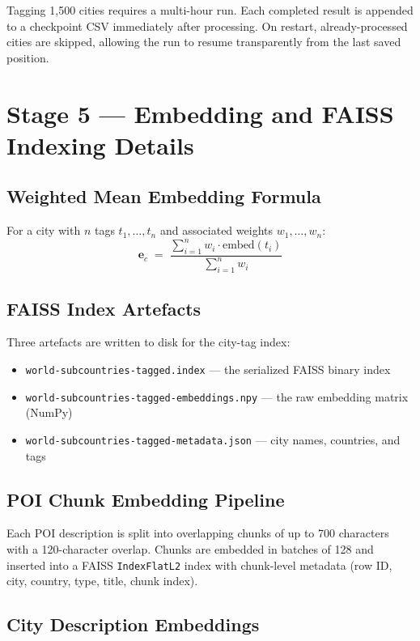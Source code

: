 \documentclass[12pt,a4paper]{report}
\begin{document}
\begin{appendices}
Tagging 1,500 cities requires a multi-hour run. Each completed result is appended to a checkpoint
CSV immediately after processing. On restart, already-processed cities are skipped, allowing the
run to resume transparently from the last saved position.

\section{Stage 5 — Embedding and FAISS Indexing Details}

\subsection{Weighted Mean Embedding Formula}

For a city with $n$ tags $t_1, \ldots, t_n$ and associated weights $w_1, \ldots, w_n$:
\[
\mathbf{e}_c \;=\; \frac{\displaystyle\sum_{i=1}^{n} w_i \cdot \mathrm{embed}(t_i)}
                        {\displaystyle\sum_{i=1}^{n} w_i}
\]

\subsection{FAISS Index Artefacts}

Three artefacts are written to disk for the city-tag index:
\begin{itemize}
    \item \texttt{world-subcountries-tagged.index} — the serialized FAISS binary index
    \item \texttt{world-subcountries-tagged-embeddings.npy} — the raw embedding matrix (NumPy)
    \item \texttt{world-subcountries-tagged-metadata.json} — city names, countries, and tags
\end{itemize}

\subsection{POI Chunk Embedding Pipeline}

Each POI description is split into overlapping chunks of up to 700 characters with a 120-character
overlap. Chunks are embedded in batches of 128 and inserted into a FAISS \texttt{IndexFlatL2} index
with chunk-level metadata (row ID, city, country, type, title, chunk index).

\subsection{City Description Embeddings}


\end{appendices}
\end{document}
